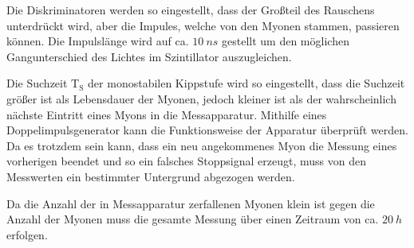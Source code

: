 Die Diskriminatoren werden so eingestellt, dass der Großteil des Rauschens unterdrückt wird, aber die Impules, welche von den Myonen stammen, passieren können.
Die Impulslänge wird auf ca. $\SI{10}{ns}$ gestellt um den möglichen Gangunterschied des Lichtes im Szintillator auszugleichen.

Die Suchzeit $\text{T}_{\text{S}}$ der monostabilen Kippstufe wird so eingestellt, dass die Suchzeit größer ist als Lebensdauer der Myonen, jedoch kleiner ist als
der wahrscheinlich nächste Eintritt eines Myons in die Messapparatur.
Mithilfe eines Doppelimpulsgenerator kann die Funktionsweise der Apparatur überprüft werden.
Da es trotzdem sein kann, dass ein neu angekommenes Myon die Messung eines vorherigen beendet und so ein falsches Stoppsignal erzeugt, muss von den Messwerten ein bestimmter Untergrund abgezogen werden.

Da die Anzahl der in Messapparatur zerfallenen Myonen klein ist gegen die Anzahl der Myonen muss die gesamte Messung über einen Zeitraum von ca. $\SI{20}{h}$ erfolgen.
